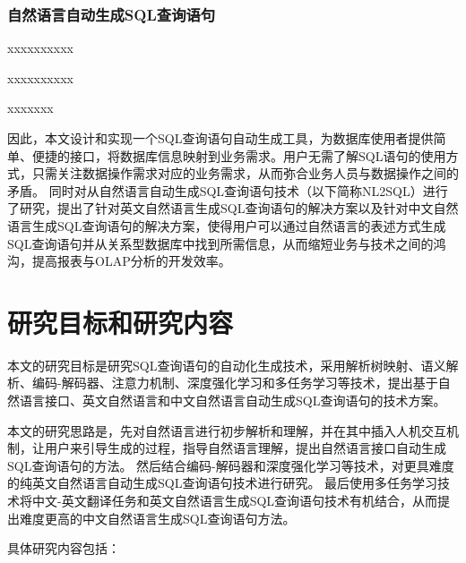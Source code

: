 \subsubsection{自然语言自动生成SQL查询语句}
\label{intro:nl2sql}
xxxxxxxxxx

xxxxxxxxxx

xxxxxxx

因此，本文设计和实现一个SQL查询语句自动生成工具，为数据库使用者提供简单、便捷的接口，将数据库信息映射到业务需求。用户无需了解SQL语句的使用方式，只需关注数据操作需求对应的业务需求，从而弥合业务人员与数据操作之间的矛盾。
同时对从自然语言自动生成SQL查询语句技术（以下简称NL2SQL）进行了研究，提出了针对英文自然语言生成SQL查询语句的解决方案以及针对中文自然语言生成SQL查询语句的解决方案，使得用户可以通过自然语言的表述方式生成SQL查询语句并从关系型数据库中找到所需信息，从而缩短业务与技术之间的鸿沟，提高报表与OLAP分析的开发效率。

\section{研究目标和研究内容}
\label{intro:targetandcontent}

本文的研究目标是研究SQL查询语句的自动化生成技术，采用解析树映射、语义解析、编码-解码器、注意力机制、深度强化学习和多任务学习等技术，提出基于自然语言接口、英文自然语言和中文自然语言自动生成SQL查询语句的技术方案。


本文的研究思路是，先对自然语言进行初步解析和理解，并在其中插入人机交互机制，让用户来引导生成的过程，指导自然语言理解，提出自然语言接口自动生成SQL查询语句的方法。
然后结合编码-解码器和深度强化学习等技术，对更具难度的纯英文自然语言自动生成SQL查询语句技术进行研究。
最后使用多任务学习技术将中文-英文翻译任务和英文自然语言生成SQL查询语句技术有机结合，从而提出难度更高的中文自然语言生成SQL查询语句方法。

具体研究内容包括：

